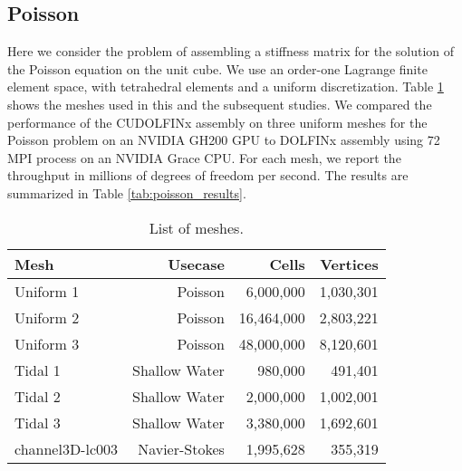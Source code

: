 \subsection*{Poisson}


Here we consider the problem of assembling a stiffness matrix for the solution of the Poisson equation on the unit cube. We use an order-one Lagrange finite element space, with tetrahedral elements and a uniform discretization. Table \ref{tab:meshes} shows the meshes used in this and the subsequent studies. We compared the performance of the CUDOLFINx assembly on three uniform meshes for the Poisson problem on an NVIDIA GH200 GPU to DOLFINx assembly using 72 MPI process on an NVIDIA Grace CPU. For each mesh, we report the throughput in millions of degrees of freedom per second. The results are summarized in Table \ref{tab:poisson_results}.
\begin{table}[t]
    \centering
\begin{tabular}{lrrr}
\toprule
Mesh & Usecase & Cells & Vertices\\
\midrule
Uniform 1 & Poisson & 6,000,000 & 1,030,301 \\
Uniform 2 & Poisson & 16,464,000 & 2,803,221 \\
Uniform 3 & Poisson & 48,000,000 & 8,120,601 \\
Tidal 1 & Shallow Water & 980,000 & 491,401 \\
Tidal 2 & Shallow Water & 2,000,000 & 1,002,001 \\
Tidal 3 & Shallow Water & 3,380,000 & 1,692,601 \\
channel3D-lc003 & Navier-Stokes & 1,995,628 & 355,319 \\
\bottomrule
\end{tabular}
\caption{List of meshes.}
    \label{tab:meshes}
\end{table}

